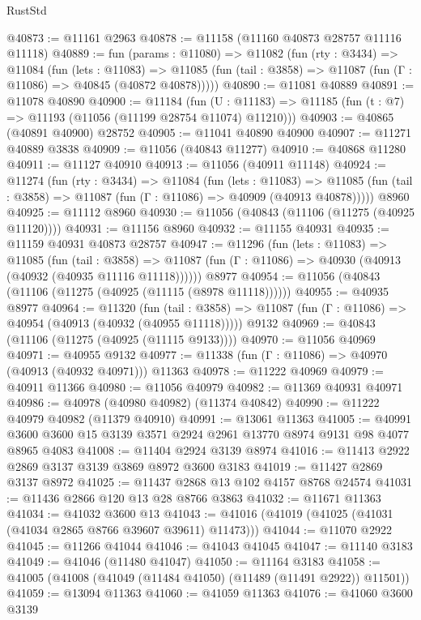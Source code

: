\begin{lexlean}{RustStd}
\begin{coremodule}
@40873 := @11161 @2963
@40878 := @11158 (@11160 @40873 @28757 @11116 @11118)
@40889 := fun (params : @11080) =>
  @11082
    (fun (rty : @3434) =>
    @11084
      (fun (lets : @11083) =>
      @11085 (fun (tail : @3858) => @11087 (fun (Γ : @11086) => @40845 (@40872 @40878)))))
@40890 := @11081 @40889
@40891 := @11078 @40890
@40900 := @11184
    (fun (U : @11183) => @11185 (fun (t : @7) => @11193 (@11056 (@11199 @28754 @11074) @11210)))
@40903 := @40865 (@40891 @40900) @28752
@40905 := @11041 @40890 @40900
@40907 := @11271 @40889 @3838
@40909 := @11056 (@40843 @11277)
@40910 := @40868 @11280
@40911 := @11127 @40910
@40913 := @11056 (@40911 @11148)
@40924 := @11274
    (fun (rty : @3434) =>
    @11084
      (fun (lets : @11083) =>
      @11085 (fun (tail : @3858) => @11087 (fun (Γ : @11086) => @40909 (@40913 @40878)))))
    @8960
@40925 := @11112 @8960
@40930 := @11056 (@40843 (@11106 (@11275 (@40925 @11120))))
@40931 := @11156 @8960
@40932 := @11155 @40931
@40935 := @11159 @40931 @40873 @28757
@40947 := @11296
    (fun (lets : @11083) =>
    @11085
      (fun (tail : @3858) =>
      @11087 (fun (Γ : @11086) => @40930 (@40913 (@40932 (@40935 @11116 @11118))))))
    @8977
@40954 := @11056 (@40843 (@11106 (@11275 (@40925 (@11115 (@8978 @11118))))))
@40955 := @40935 @8977
@40964 := @11320
    (fun (tail : @3858) => @11087 (fun (Γ : @11086) => @40954 (@40913 (@40932 (@40955 @11118)))))
    @9132
@40969 := @40843 (@11106 (@11275 (@40925 (@11115 @9133))))
@40970 := @11056 @40969
@40971 := @40955 @9132
@40977 := @11338 (fun (Γ : @11086) => @40970 (@40913 (@40932 @40971))) @11363
@40978 := @11222 @40969
@40979 := @40911 @11366
@40980 := @11056 @40979
@40982 := @11369 @40931 @40971
@40986 := @40978 (@40980 @40982) (@11374 @40842)
@40990 := @11222 @40979 @40982 (@11379 @40910)
@40991 := @13061 @11363
@41005 := @40991 @3600 @3600 @15 @3139 @3571 @2924 @2961 @13770 @8974 @9131 @98 @4077 @8965 @4083
@41008 := @11404 @2924 @3139 @8974
@41016 := @11413 @2922 @2869 @3137 @3139 @3869 @8972 @3600 @3183
@41019 := @11427 @2869 @3137 @8972
@41025 := @11437 @2868 @13 @102 @4157 @8768 @24574
@41031 := @11436 @2866 @120 @13 @28 @8766 @3863
@41032 := @11671 @11363
@41034 := @41032 @3600 @13
@41043 := @41016 (@41019 (@41025 (@41031 (@41034 @2865 @8766 @39607 @39611) @11473)))
@41044 := @11070 @2922
@41045 := @11266 @41044
@41046 := @41043 @41045
@41047 := @11140 @3183
@41049 := @41046 (@11480 @41047)
@41050 := @11164 @3183
@41058 := @41005 (@41008 (@41049 (@11484 @41050) (@11489 (@11491 @2922)) @11501))
@41059 := @13094 @11363
@41060 := @41059 @11363
@41076 := @41060
    @3600
    @3139

\end{coremodule}
\end{lexlean}
